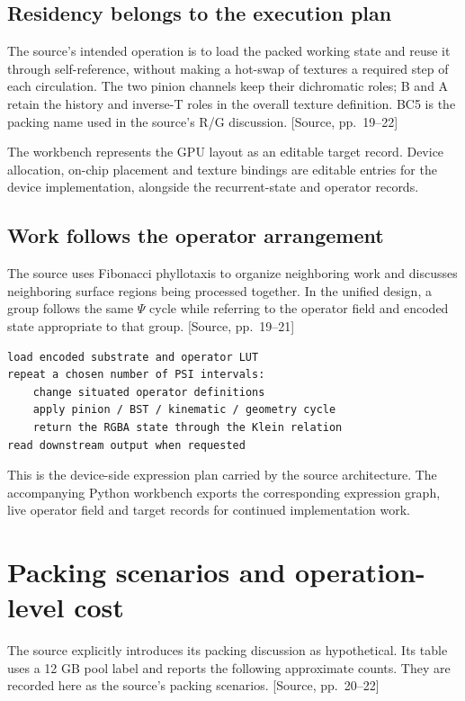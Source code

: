 \documentclass[11pt,a4paper]{article}
\newcommand{\src}[1]{{\sffamily\footnotesize\color{DWGray}[Source, pp.~#1]}}
\begin{document}
\subsection{Residency belongs to the execution plan}
The source's intended operation is to load the packed working state and reuse it through self-reference, without making a hot-swap of textures a required step of each circulation. The two pinion channels keep their dichromatic roles; B and A retain the history and inverse-T roles in the overall texture definition. BC5 is the packing name used in the source's R/G discussion. \src{19--22}

The workbench represents the GPU layout as an editable target record. Device allocation, on-chip placement and texture bindings are editable entries for the device implementation, alongside the recurrent-state and operator records.

\subsection{Work follows the operator arrangement}
The source uses Fibonacci phyllotaxis to organize neighboring work and discusses neighboring surface regions being processed together. In the unified design, a group follows the same $\Psi$ cycle while referring to the operator field and encoded state appropriate to that group. \src{19--21}

\begin{lstlisting}
load encoded substrate and operator LUT
repeat a chosen number of PSI intervals:
    change situated operator definitions
    apply pinion / BST / kinematic / geometry cycle
    return the RGBA state through the Klein relation
read downstream output when requested
\end{lstlisting}

This is the device-side expression plan carried by the source architecture. The accompanying Python workbench exports the corresponding expression graph, live operator field and target records for continued implementation work.
\clearpage

\section{Packing scenarios and operation-level cost}
The source explicitly introduces its packing discussion as hypothetical. Its table uses a 12 GB pool label and reports the following approximate counts. They are recorded here as the source's packing scenarios. \src{20--22}
\end{document}
